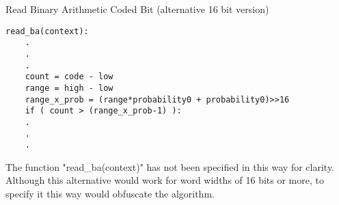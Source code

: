 \begin{informative}
Read Binary Arithmetic Coded Bit (alternative 16 bit version)
\begin{verbatim}
read_ba(context):
    .
    .
    .
    count = code - low
    range = high - low
    range_x_prob = (range*probability0 + probability0)>>16
    if ( count > (range_x_prob-1) ):
    .
    .
    .
\end{verbatim}

The function "read\_ba(context)" has not been specified in this way for
clarity. Although this alternative would work for word widths of 16 bits
or more, to specify it this way would obfuscate the algorithm.

\end{informative}
